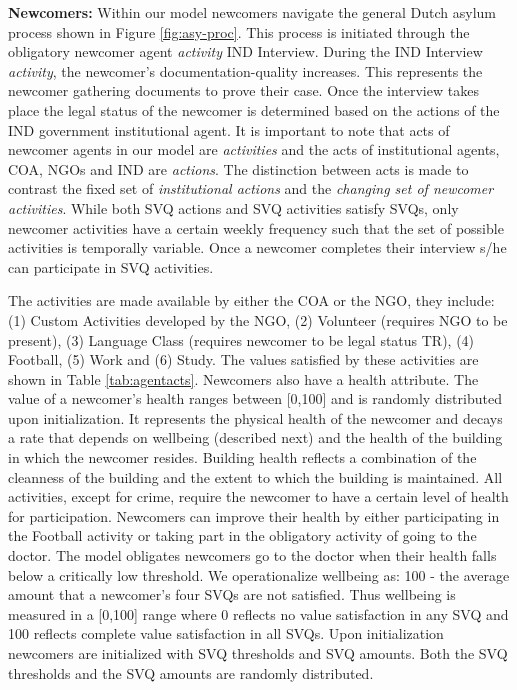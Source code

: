 \documentclass{scspaperproc}
\theoremstyle{scsthe}
\begin{document}
{\bf Newcomers:} Within our model newcomers navigate the general Dutch asylum process shown in Figure \ref{fig:asy-proc}. This process is initiated through the obligatory newcomer agent \emph{activity} IND Interview. During the IND Interview \emph{activity}, the newcomer's documentation-quality increases. This represents the newcomer gathering documents to prove their case. Once the interview takes place the legal status of the newcomer is determined based on the actions of the IND government institutional agent. It is important to note that acts of newcomer agents in our model are \emph{activities} and the acts of institutional agents, COA, NGOs and IND are \emph{actions}. The distinction between acts is made to contrast the fixed set of \emph{institutional actions} and the \emph{changing set of newcomer activities}. While both SVQ actions and SVQ activities satisfy SVQs, only newcomer activities have a certain weekly frequency such that the set of possible activities is temporally variable. Once a newcomer completes their interview s/he can participate in SVQ activities. 

The activities are made available by either the COA or the NGO, they include: (1) Custom Activities developed by the NGO, (2) Volunteer (requires NGO to be present), (3) Language Class (requires newcomer to be legal status TR), (4) Football, (5) Work and (6) Study. The values satisfied by these activities are shown in Table \ref{tab:agentacts}. Newcomers also have a health attribute. The value of a newcomer's health ranges between [0,100] and is randomly distributed upon initialization. It represents the physical health of the newcomer and decays a rate that depends on wellbeing (described next) and the health of the building in which the newcomer resides. Building health reflects a combination of the cleanness of the building and the extent to which the building is maintained. All activities, except for crime, require the newcomer to have a certain level of health for participation. Newcomers can improve their health by either participating in the Football activity or taking part in the obligatory activity of going to the doctor. The model obligates newcomers go to the doctor when their health falls below a critically low threshold. We operationalize wellbeing as: 100 - the average amount that a newcomer's four SVQs are not satisfied. Thus wellbeing is measured in a [0,100] range where 0 reflects no value satisfaction in any SVQ and 100 reflects complete value satisfaction in all SVQs. Upon initialization newcomers are initialized with SVQ thresholds and SVQ amounts. Both the SVQ thresholds and the SVQ amounts are randomly distributed. %
\end{document}
